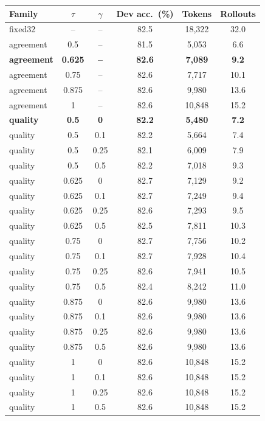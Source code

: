 \begin{tabular}{lccccc}
\toprule
Family & $\tau$ & $\gamma$ & Dev acc.\ (\%) & Tokens & Rollouts \\
\midrule
fixed32 & -- & -- & 82.5 & 18,322 & 32.0 \\
agreement & 0.5 & -- & 81.5 & 5,053 & 6.6 \\
\textbf{agreement} & \textbf{0.625} & \textbf{--} & \textbf{82.6} & \textbf{7,089} & \textbf{9.2} \\
agreement & 0.75 & -- & 82.6 & 7,717 & 10.1 \\
agreement & 0.875 & -- & 82.6 & 9,980 & 13.6 \\
agreement & 1 & -- & 82.6 & 10,848 & 15.2 \\
\textbf{quality} & \textbf{0.5} & \textbf{0} & \textbf{82.2} & \textbf{5,480} & \textbf{7.2} \\
quality & 0.5 & 0.1 & 82.2 & 5,664 & 7.4 \\
quality & 0.5 & 0.25 & 82.1 & 6,009 & 7.9 \\
quality & 0.5 & 0.5 & 82.2 & 7,018 & 9.3 \\
quality & 0.625 & 0 & 82.7 & 7,129 & 9.2 \\
quality & 0.625 & 0.1 & 82.7 & 7,249 & 9.4 \\
quality & 0.625 & 0.25 & 82.6 & 7,293 & 9.5 \\
quality & 0.625 & 0.5 & 82.5 & 7,811 & 10.3 \\
quality & 0.75 & 0 & 82.7 & 7,756 & 10.2 \\
quality & 0.75 & 0.1 & 82.7 & 7,928 & 10.4 \\
quality & 0.75 & 0.25 & 82.6 & 7,941 & 10.5 \\
quality & 0.75 & 0.5 & 82.4 & 8,242 & 11.0 \\
quality & 0.875 & 0 & 82.6 & 9,980 & 13.6 \\
quality & 0.875 & 0.1 & 82.6 & 9,980 & 13.6 \\
quality & 0.875 & 0.25 & 82.6 & 9,980 & 13.6 \\
quality & 0.875 & 0.5 & 82.6 & 9,980 & 13.6 \\
quality & 1 & 0 & 82.6 & 10,848 & 15.2 \\
quality & 1 & 0.1 & 82.6 & 10,848 & 15.2 \\
quality & 1 & 0.25 & 82.6 & 10,848 & 15.2 \\
quality & 1 & 0.5 & 82.6 & 10,848 & 15.2 \\
\bottomrule
\end{tabular}